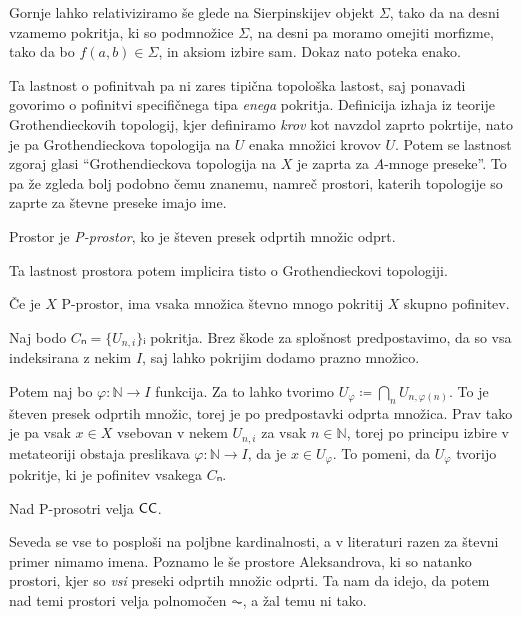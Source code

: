 \begin{opomba}
  Gornje lahko relativiziramo še glede na Sierpinskijev objekt \(Σ\), tako da na
  desni vzamemo pokritja, ki so podmnožice \(Σ\), na desni pa moramo omejiti
  morfizme, tako da bo \(f(a,b) ∈ Σ\), in aksiom izbire sam. Dokaz nato poteka
  enako.
\end{opomba}

Ta lastnost o pofinitvah pa ni zares tipična topološka lastost, saj ponavadi
govorimo o pofinitvi specifičnega tipa \emph{enega} pokritja. Definicija izhaja
iz teorije Grothendieckovih topologij, kjer definiramo \emph{krov} kot navzdol
zaprto pokrtije, nato je pa Grothendieckova topologija na \(U\) enaka množici
krovov \(U\). Potem se lastnost zgoraj glasi ``Grothendieckova topologija na
\(X\) je zaprta za \(A\)-mnoge preseke''. To pa že zgleda bolj podobno čemu
znanemu, namreč prostori, katerih topologije so zaprte za števne preseke imajo
ime.

\begin{definicija}\label{def:psp}
  Prostor je \emph{P-prostor}, ko je števen presek odprtih množic odprt.
\end{definicija}

Ta lastnost prostora potem implicira tisto o Grothendieckovi topologiji.

\begin{trditev}\label{th:psp-is-pgt}
  Če je \(X\) P-prostor, ima vsaka množica števno mnogo pokritij \(X\) skupno
  pofinitev.
\end{trditev}
\begin{dokaz}
  Naj bodo \(Cₙ = \{U_{n,i}\}ᵢ\) pokritja. Brez škode za splošnost
  predpostavimo, da so vsa indeksirana z nekim \(I\), saj lahko pokrijim dodamo
  prazno množico.

  Potem naj bo \(φ : ℕ → I\) funkcija. Za to lahko tvorimo
  \(U_φ ≔ ⋂_nU_{n,φ(n)}\). To je števen presek odprtih množic, torej je po
  predpostavki odprta množica. Prav tako je pa vsak \(x ∈ X\) vsebovan v nekem
  \(U_{n,i}\) za vsak \(n ∈ ℕ\), torej po principu izbire v metateoriji obstaja
  preslikava \(φ : ℕ → I\), da je \(x ∈ U_φ\). To pomeni, da \(U_φ\) tvorijo
  pokritje, ki je pofinitev vsakega \(Cₙ\).
\end{dokaz}
\begin{posledica}\label{th:psp-has-cc}
  Nad P-prosotri velja \(\textnormal{\sffamily CC}\).
\end{posledica}
Seveda se vse to posploši na poljbne kardinalnosti, a v literaturi razen za
števni primer nimamo imena. Poznamo le še prostore Aleksandrova, ki so natanko
prostori, kjer so \emph{vsi} preseki odprtih množic odprti. Ta nam da idejo, da
potem nad temi prostori velja polnomočen \(\AC\), a žal temu ni tako.

